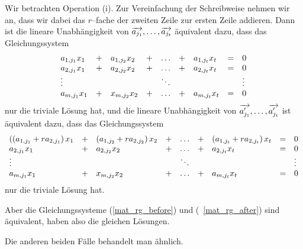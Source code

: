 Wir betrachten Operation (i). Zur Vereinfachung der Schreibweise nehmen wir an, dass
wir dabei das $r$--fache der zweiten Zeile zur ersten Zeile addieren. Dann ist die 
lineare Unabhängigkeit von $\overrightarrow{a_{j_1}}, \ldots , 
\overrightarrow{a_{j_t}}$ äquivalent dazu, dass das Gleichungssystem
  	\begin{equation}\label{mat_rg_before}
	\begin{array} {l c l c l c l c l }
  	a_{1, j_1} x_1 & + & a_{1, j_2} x_2 & + & \ldots & + & a_{1, j_t} x_t & = & 0 \\
  	a_{2, j_1} x_1 & + & a_{2, j_2} x_2 & + & \ldots & + & a_{2, j_t} x_t & = & 0 \\
  	\vdots & & & & \ddots & & & & \vdots \\
  	a_{m, j_1} x_1 & + & x_{m, j_2} x_2 & + & \ldots & + & a_{m, j_t} x_t & = & 0 
  	\end{array} 
  	\end{equation}
nur die triviale Lösung hat,
und die lineare Unabhängigkeit von $\overrightarrow{a^{\prime}_{j_1}}, \ldots , 
\overrightarrow{a^{\prime}_{j_t}}$ ist äquivalent dazu, dass das Gleichungssystem
  	\begin{equation}\label{mat_rg_after}
  	\begin{array} {l c l c l c l c l }
   	\left((a_{1, j_1} + r a_{2, j_1}\right) x_1 & + & 
   	\left(a_{1, j_2} + r a_{2, j_2}\right) x_2 & + & \ldots & + & 
   	\left(a_{1, j_t} + r a_{2, j_t}\right) x_t & = & 0 \\
  	a_{2, j_1} x_1 & + & a_{2, j_2} x_2 & + & \ldots & + & a_{2, j_t} x_t & = & 0 \\
  	\vdots & & & & \ddots & & & & \vdots \\
  	a_{m, j_1} x_1 & + & x_{m, j_2} x_2 & + & \ldots & + & a_{m, j_t} x_t & = & 0 
  	\end{array} 
  	\end{equation}
nur die triviale Lösung hat. 

Aber die Gleichungssysteme (\ref{mat_rg_before}) und (~\ref{mat_rg_after}) 
sind äquivalent, haben also die gleichen Lösungen. 

Die anderen beiden Fälle behandelt man ähnlich.

